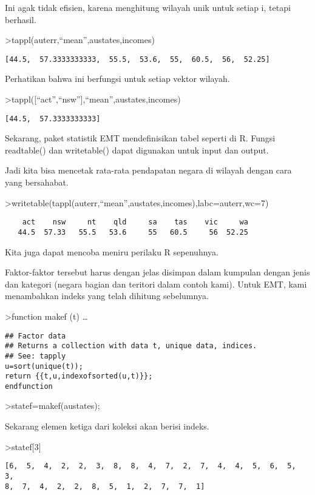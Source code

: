 \documentclass[
]{book}
\begin{document}
Ini agak tidak efisien, karena menghitung wilayah unik untuk setiap i, tetapi berhasil.

\textgreater tappl(auterr,``mean'',austates,incomes)

\begin{verbatim}
[44.5,  57.3333333333,  55.5,  53.6,  55,  60.5,  56,  52.25]
\end{verbatim}

Perhatikan bahwa ini berfungsi untuk setiap vektor wilayah.

\textgreater tappl({[}``act'',``nsw''{]},``mean'',austates,incomes)

\begin{verbatim}
[44.5,  57.3333333333]
\end{verbatim}

Sekarang, paket statistik EMT mendefinisikan tabel seperti di R. Fungsi readtable() dan writetable() dapat digunakan untuk input dan output.

Jadi kita bisa mencetak rata-rata pendapatan negara di wilayah dengan cara yang bersahabat.

\textgreater writetable(tappl(auterr,``mean'',austates,incomes),labc=auterr,wc=7)

\begin{verbatim}
    act    nsw     nt    qld     sa    tas    vic     wa
   44.5  57.33   55.5   53.6     55   60.5     56  52.25
\end{verbatim}

Kita juga dapat mencoba meniru perilaku R sepenuhnya.

Faktor-faktor tersebut harus dengan jelas disimpan dalam kumpulan dengan jenis dan kategori (negara bagian dan teritori dalam contoh kami). Untuk EMT, kami menambahkan indeks yang telah dihitung sebelumnya.

\textgreater function makef (t) \ldots{}

\begin{verbatim}
## Factor data
## Returns a collection with data t, unique data, indices.
## See: tapply
u=sort(unique(t));
return {{t,u,indexofsorted(u,t)}};
endfunction
\end{verbatim}

\textgreater statef=makef(austates);

Sekarang elemen ketiga dari koleksi akan berisi indeks.

\textgreater statef{[}3{]}

\begin{verbatim}
[6,  5,  4,  2,  2,  3,  8,  8,  4,  7,  2,  7,  4,  4,  5,  6,  5,  3,
8,  7,  4,  2,  2,  8,  5,  1,  2,  7,  7,  1]
\end{verbatim}
\end{document}
